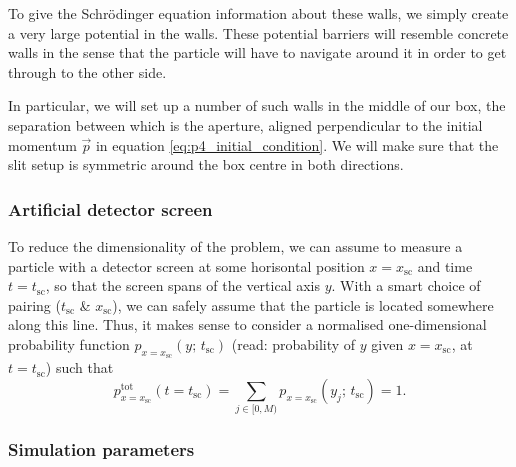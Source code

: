         To give the Schrödinger equation information about these walls, we simply create a very large potential in the walls. These potential barriers will resemble concrete  walls in the sense that the particle will have to navigate around it in order to get through to the other side.

        In particular, we will set up a number of such walls in the middle of our box, the separation between which is the aperture, aligned perpendicular to the initial momentum $\vec{p}$ in equation \eqref{eq:p4_initial_condition}. We will make sure that the slit setup is symmetric around the box centre in both directions.


    \subsubsection{Artificial detector screen}\label{sec:method:screen}

        To reduce the dimensionality of the problem, we can assume to measure a particle with a detector screen at some horisontal position $x=x_\mathrm{sc}$ and time $t=t_\mathrm{sc}$, so that the screen spans of the vertical axis $y$. With a smart choice of pairing ($t_\mathrm{sc}$ \& $x_\mathrm{sc}$), we can safely assume that the particle is located somewhere along this line. Thus, it makes sense to consider a normalised one-dimensional probability function $p_{x=x_\mathrm{sc}}(y;\, t_\mathrm{sc})$ (read: probability of $y$ given $x=x_\mathrm{sc}$, at $t=t_\mathrm{sc}$) such that
        \begin{equation}\label{eq:tot_probability_along_y}
            p^\mathrm{tot}_{x=x_\mathrm{sc}}(t\!=\!t_\mathrm{sc}) =\sum_{j\in [0, M)} p_{x=x_\mathrm{sc}}(y_j;\, t_\mathrm{sc}) = 1.
        \end{equation}



    \subsubsection{Simulation parameters}\label{sec:method:simulation_parameters}

